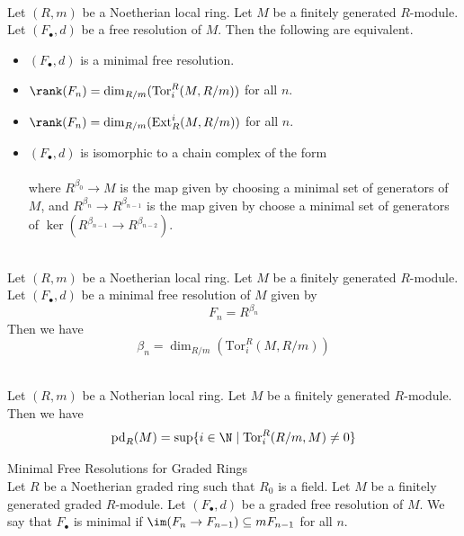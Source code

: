 \documentclass[a4paper]{article}
\begin{document}
\begin{prp}{}{}\\
Let $(R,m)$ be a Noetherian local ring. Let $M$ be a finitely generated $R$-module. Let $(F_\bullet,d)$ be a free resolution of $M$. Then the following are equivalent. 
\begin{itemize}
\item $(F_\bullet,d)$ is a minimal free resolution. 
\item $\rank(F_n)=\dim_{R/m}(\text{Tor}_i^R(M,R/m))$ for all $n$. 
\item $\rank(F_n)=\dim_{R/m}(\text{Ext}_R^i(M,R/m))$ for all $n$. 
\item $(F_\bullet,d)$ is isomorphic to a chain complex of the form \\
\\
where $R^{\beta_0}\to M$ is the map given by choosing a minimal set of generators of $M$, and $R^{\beta_n}\to R^{\beta_{n-1}}$ is the map given by choose a minimal set of generators of $\ker(R^{\beta_{n-1}}\to R^{\beta_{n-2}})$. 
\end{itemize}
\end{prp}

\begin{prp}{}{}\\
Let $(R,m)$ be a Noetherian local ring. Let $M$ be a finitely generated $R$-module. Let $(F_\bullet,d)$ be a minimal free resolution of $M$ given by $$F_n=R^{\beta_n}$$ Then we have $$\beta_n=\dim_{R/m}(\text{Tor}_i^R(M,R/m))$$
\end{prp}

\begin{prp}{}{}\\
Let $(R,m)$ be a Notherian local ring. Let $M$ be a finitely generated $R$-module. Then we have $$\text{pd}_R(M)=\text{sup}\{i\in\N\;|\;\text{Tor}_i^R(R/m,M)\neq 0\}$$
\end{prp}

\begin{defn}{Minimal Free Resolutions for Graded Rings}{}\\
Let $R$ be a Noetherian graded ring such that $R_0$ is a field. Let $M$ be a finitely generated graded $R$-module. Let $(F_\bullet,d)$ be a graded free resolution of $M$. We say that $F_\bullet$ is minimal if $\im(F_n\to F_{n-1})\subseteq mF_{n-1}$ for all $n$. 
\end{defn}
\end{document}

